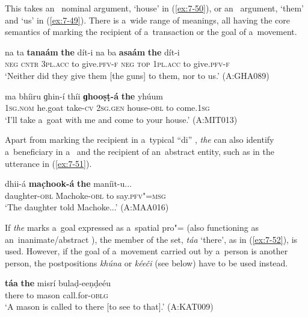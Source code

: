  This  takes an~ nominal argument, `house' in (\ref{ex:7-50}), or an~  argument, `them' and `us' in (\ref{ex:7-49}). There is a~wide range of meanings, all having the core semantics of marking the recipient of a~transaction or the goal of a~movement. 
\begin{exe}
\ex
\label{ex:7-49}
\gll na ta \textbf{tanaám} \textbf{the} dít-i na ba  \textbf{asaám} \textbf{the} dít-i \\
\textsc{neg} \textsc{cntr} \textsc{3pl.acc} to give.\textsc{pfv-f} \textsc{neg} \textsc{top} \textsc{1pl.acc} to give.\textsc{pfv-f} \\
\glt `Neither did they give them [the guns] to them, nor to us.' (A:GHA089)
\end{exe}
\begin{exe}
\ex
\label{ex:7-50}
\gll ma bhíiru ɡhin-í thíi \textbf{ɡhooṣṭ-á} \textbf{the} yhúum \\
\textsc{1sg.nom} he.goat take-\textsc{cv} \textsc{2sg.gen} house-\textsc{obl} to come.\textsc{1sg} \\
\glt `I'll take a~goat with me and come to your house.' (A:MIT013)
\end{exe}

Apart from marking the recipient in a~typical ``di'' , \textit{the} can also identify a~beneficiary in a~  and the recipient of an~abstract entity, such as in the utterance in (\ref{ex:7-51}). 

\begin{exe}
\ex
\label{ex:7-51}
\gll dhii-á \textbf{mac̣hook-á} \textbf{the} maníit-u... \\
daughter-\textsc{obl} Machoke-\textsc{obl} to say.\textsc{pfv"=msg} \\
\glt `The daughter told Machoke...' (A:MAA016)
\end{exe}

If \textit{the} marks a~goal expressed as a~spatial pro"= (also functioning as an~in\-animate/abstract  ), the  member of the set, \textit{táa} `there', as in (\ref{ex:7-52}), is used. However, if the goal of a~movement carried out by a~person is another person, the postpositions \textit{khúna} or \textit{kéeči} (see below) have to be used instead.


\begin{exe}
\ex
\label{ex:7-52}
\gll \textbf{táa} \textbf{the} misrí bulaḍ-eeṇḍeéu \\
there to mason call.for-\textsc{oblg}\\
\glt `A mason is called to there [to see to that].' (A:KAT009)
\end{exe}


